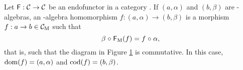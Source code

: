 
\begin{definition}%
  \label{def:algebra-homomorphism}


  Let $\mathsf{F}: \mathcal{C} \to \mathcal{C}$ be an endofunctor in a category
  . If $(a,\alpha)$ and $(b,\beta)$ are -algebras, an
  -algebra homomorphism $f: (a,\alpha) \to (b,\beta)$
  is a morphism $f: a \to b \in \mathcal{C}_{\operatorname{M}}$ such that
  \begin{equation}
    \label{eq:algebra-homomorphism}
    \beta \mathrel{\circ} \mathsf{F}_{\operatorname{M}}(f) = f \mathrel{\circ} \alpha
    \text{,}
  \end{equation}
  that is, such that the diagram in Figure
  \ref{fig:algebra-homomorphism} is commutative. In this case,
  $\operatorname{dom}(f) = (a,\alpha)$ and $\operatorname{cod}(f) = (b,\beta)$.
  \begin{figure}[htbp]
    \begin{center}
    \end{center}
    \caption{}
    \label{fig:algebra-homomorphism}
  \end{figure}

\end{definition}


